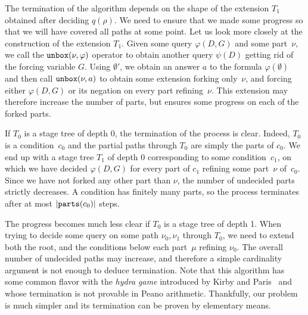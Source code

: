 The termination of the algorithm depends on the shape of the extension $T_1$ obtained
after deciding $q(\rho)$. We need to ensure that we made some progress so that we will
have covered all paths at some point. Let us look more closely at the construction of the extension $T_1$.
Given some query $\varphi(D, G)$ and some part~$\nu$, we call the $\mathtt{unbox}(\nu, \varphi)$ operator to obtain another
query $\psi(D)$ getting rid of the forcing variable $G$. Using $\emptyset'$, we obtain an answer $a$
to the formula $\varphi(\emptyset)$ and then call $\mathtt{unbox}(\nu, a)$ to obtain some extension 
forking only~$\nu$, and forcing either $\varphi(D,G)$ or its negation on every part refining~$\nu$.
This extension may therefore increase the number of parts, but ensures some progress on each of the forked parts.

If $T_0$ is a stage tree of depth 0, the termination of the process is clear.
Indeed, $T_0$ is a condition~$c_0$ and the partial paths through $T_0$ are simply the parts of $c_0$.
We end up with a stage tree $T_1$ of depth 0 corresponding to some condition~$c_1$,
on which we have decided $\varphi(D,G)$ for every part of $c_1$ refining some part~$\nu$ of~$c_0$.
Since we have not forked any other part than $\nu$, the number of undecided parts strictly decreases.
A condition has finitely many parts, so the process terminates after at most $|\mathtt{parts}(c_0)|$
steps.

The progress becomes much less clear if $T_0$ is a stage tree of depth 1.
When trying to decide some query on some path $\nu_0,\nu_1$ through $T_0$, we need to extend
both the root, and the conditions below each part~$\mu$ refining $\nu_0$.
The overall number of undecided paths may increase, and therefore a simple cardinality argument
is not enough to deduce termination.
Note that this algorithm has some common flavor with the \emph{hydra game}
introduced by Kirby and Paris~\cite{Kirby1982Accessible} and whose termination
is not provable in Peano arithmetic. Thankfully, our problem is much simpler
and its termination can be proven by elementary means.

